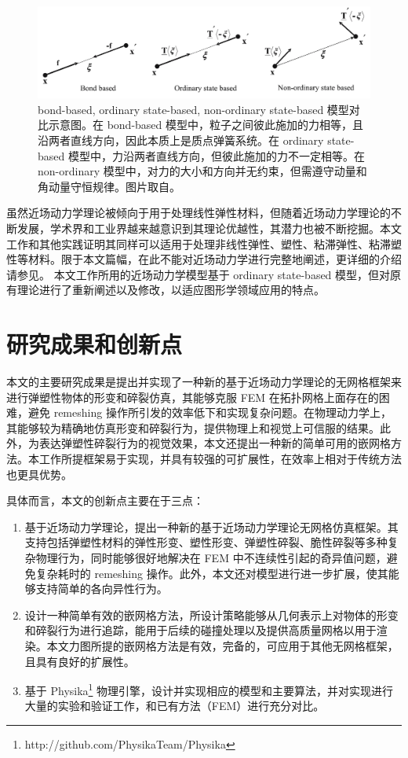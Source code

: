 \begin{figure}[htbp!]
  \centering
  \captionsetup{justification=centering}
  \includegraphics[width=\linewidth]{chap/image/peridynamics_models}

  \caption{\label{peridynamics_models}
           bond-based, ordinary state-based, non-ordinary state-based 模型对比示意图。在 bond-based 模型中，粒子之间彼此施加的力相等，且沿两者直线方向，因此本质上是质点弹簧系统。在 ordinary state-based 模型中，力沿两者直线方向，但彼此施加的力不一定相等。在 non-ordinary 模型中，对力的大小和方向并无约束，但需遵守动量和角动量守恒规律。图片取自。
          }
\end{figure}

虽然近场动力学理论被倾向于用于处理线性弹性材料，但随着近场动力学理论的不断发展，学术界和工业界越来越意识到其理论优越性，其潜力也被不断挖掘。本文工作和其他实践证明其同样可以适用于处理非线性弹性、塑性、粘滞弹性、粘滞塑性等材料。限于本文篇幅，在此不能对近场动力学进行完整地阐述，更详细的介绍请参见。 本文工作所用的近场动力学模型基于 ordinary state-based 模型，但对原有理论进行了重新阐述以及修改，以适应图形学领域应用的特点。

\section{研究成果和创新点}

本文的主要研究成果是提出并实现了一种新的基于近场动力学理论的无网格框架来进行弹塑性物体的形变和碎裂仿真，其能够克服 FEM 在拓扑网格上面存在的困难，避免 remeshing 操作所引发的效率低下和实现复杂问题。在物理动力学上，其能够较为精确地仿真形变和碎裂行为，提供物理上和视觉上可信服的结果。此外，为表达弹塑性碎裂行为的视觉效果，本文还提出一种新的简单可用的嵌网格方法。本工作所提框架易于实现，并具有较强的可扩展性，在效率上相对于传统方法也更具优势。

具体而言，本文的创新点主要在于三点：
\begin{enumerate}
  \item 基于近场动力学理论，提出一种新的基于近场动力学理论无网格仿真框架。其支持包括弹塑性材料的弹性形变、塑性形变、弹塑性碎裂、脆性碎裂等多种复杂物理行为，同时能够很好地解决在 FEM 中不连续性引起的奇异值问题，避免复杂耗时的 remeshing 操作。此外，本文还对模型进行进一步扩展，使其能够支持简单的各向异性行为。
  \item 设计一种简单有效的嵌网格方法，所设计策略能够从几何表示上对物体的形变和碎裂行为进行追踪，能用于后续的碰撞处理以及提供高质量网格以用于渲染。本文力图所提的嵌网格方法是有效，完备的，可应用于其他无网格框架，且具有良好的扩展性。
  \item 基于 Physika\footnote{http://github.com/PhysikaTeam/Physika} 物理引擎，设计并实现相应的模型和主要算法，并对实现进行大量的实验和验证工作，和已有方法（FEM）进行充分对比。
\end{enumerate}

